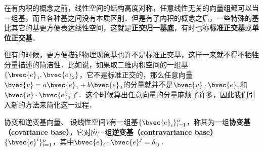 

在有内积的概念之前，线性空间的结构高度对称，任意线性无关的向量组都可以当一组基，而且各种基之间没有本质区别．但是有了内积的概念之后，一些特殊的基比其它的基更方便表达线性空间，这就是\textbf{正交归一基底}，有时也称\textbf{标准正交基}或\textbf{单位正交基}．

但有的时候，更方便描述物理现象基也许不是标准正交基，这样一来就不得不牺牲分量描述的简洁性．比如说，如果取二维内积空间的一组基$\{\bvec{e}_1, \bvec{e}_2\}$，它不是标准正交的，那么任意向量$\bvec{v}=a\bvec{e}_1+b\bvec{e}_2$的分量就并不是$\bvec{v}\cdot\bvec{e}_1$和$\bvec{v}\cdot\bvec{e}_2$了．这个时候算出任意向量的分量麻烦了许多，因此我们引入新的方法来简化这一过程．

\begin{definition}{协变和逆变基向量、}
设线性空间$V$有一组基$\{\bvec{e}_i\}_{i=1}^n$，称其为一组\textbf{协变基（covariance base）}，它对应一组\textbf{逆变基（contravariance base）}$\{\bvec{e}^i\}_{i=1}^n$，其中$\bvec{e}_i\cdot\bvec{e}^j=\delta_{ij}$．
\end{definition}


